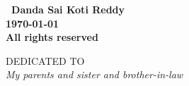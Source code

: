 \documentclass[oneside,12pt]{./thesisStyle/IIScthesisPSnPDF}
\newcommand{\blankpage}{
\newpage
\thispagestyle{empty}
\mbox{}
\newpage
}
\newcommand{\blankpagewithnumber}{
\newpage
\mbox{}
\newpage
}
\begin{document}
\blankpage

\vspace*{\fill}
\begin{center}
\large\bf \textcopyright \ Danda Sai Koti Reddy\\
\large\bf \monthyeardate\today\\
\large\bf All rights reserved
\end{center}
\vspace*{\fill}
\thispagestyle{empty}

\blankpage

\vspace*{\fill}
\begin{center}
DEDICATED TO \\[2em]
\Large\it My parents and sister and brother-in-law%
\end{center}
\vspace*{\fill}
\thispagestyle{empty}

%

\setcounter{secnumdepth}{3}
\setcounter{tocdepth}{3}
\frontmatter %
% 



\tableofcontents
\listoffigures
\listoftables
\mainmatter %
\setcounter{page}{1}

%

%
%






\end{document}
